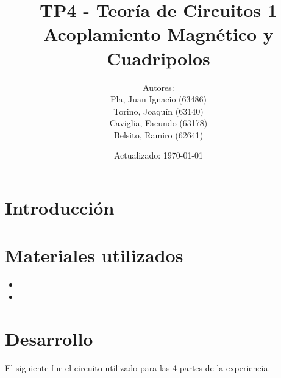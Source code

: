 \documentclass[a4paper,12pt]{article}
\title{TP4 - Teoría de Circuitos 1\\ Acoplamiento Magnético y Cuadripolos}
\author{Autores: \\Pla, Juan Ignacio (63486)\\Torino, Joaquín (63140)\\Caviglia, Facundo (63178)\\Belsito, Ramiro (62641)}
\date{Actualizado: \today}
\begin{document}
\maketitle

\section{Introducción}
\hspace{1cm}

\hspace{1cm}

\hspace{1cm}
\hspace{1cm}

\section{Materiales utilizados}

\begin{itemize}
\item
\item 
\end{itemize}

\section{Desarrollo}

\hspace{1cm} El siguiente fue el circuito utilizado para las 4 partes de la experiencia.
\end{document}
